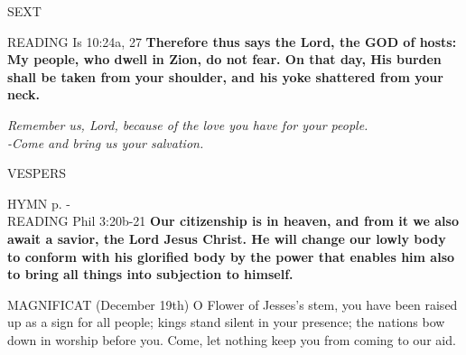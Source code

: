 \begin{flushleft}\normalsize{\uppercase{Sext\\}}\end{flushleft}
\noindent\small{\uppercase{Reading}} Is 10:24a, 27 \textbf {Therefore thus says the Lord, the GOD of hosts: My people, who dwell in Zion, do not fear. On that day, His burden shall be taken from your shoulder, and his yoke shattered from your neck.\\}
\begin{center}
\textit {Remember us, Lord, because of the love you have for your people.\\
-Come and bring us your salvation.}
\end{center}

\begin{flushleft}\normalsize{\uppercase{Vespers\\}}\end{flushleft}
\small{\uppercase{Hymn} p. \pageref{advent:firstHymn}-\pageref{advent:lastHymn}\\}
\noindent\small{\uppercase{Reading}} Phil 3:20b-21 \textbf {Our citizenship is in heaven, and from it we also await a savior, the Lord Jesus Christ. He will change our lowly body to conform with his glorified body by the power that enables him also to bring all things into subjection to himself.\\}

\noindent\small{\uppercase{Magnificat}} (December 19th)
O Flower of Jesses's stem, you have been raised up as a sign for all people; kings stand silent in your presence; the nations bow down in worship before you. Come, let nothing keep you from coming to our aid.
